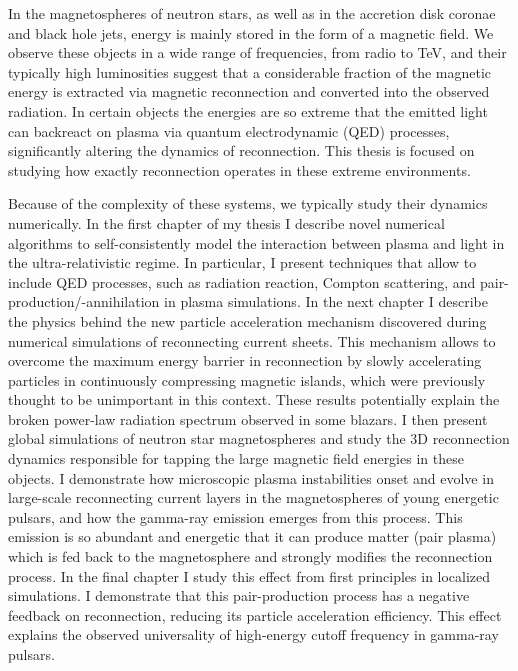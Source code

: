 In the magnetospheres of neutron stars, as well as in the accretion disk coronae and black hole jets, energy is mainly stored in the form of a magnetic field. We observe these objects in a wide range of frequencies, from radio to TeV, and their typically high luminosities suggest that a considerable fraction of the magnetic energy is extracted via magnetic reconnection and converted into the observed radiation. In certain objects the energies are so extreme that the emitted light can backreact on plasma via quantum electrodynamic (QED) processes, significantly altering the dynamics of reconnection. This thesis is focused on studying how exactly reconnection operates in these extreme environments. 

Because of the complexity of these systems, we typically study their dynamics numerically. In the first chapter of my thesis I describe novel numerical algorithms to self-consistently model the interaction between plasma and light in the ultra-relativistic regime. In particular, I present techniques that allow to include QED processes, such as radiation reaction, Compton scattering, and pair-production/-annihilation in plasma simulations. In the next chapter I describe the physics behind the new particle acceleration mechanism discovered during numerical simulations of reconnecting current sheets. This mechanism allows to overcome the maximum energy barrier in reconnection by slowly accelerating particles in continuously compressing magnetic islands, which were previously thought to be unimportant in this context. These results potentially explain the broken power-law radiation spectrum observed in some blazars. I then present global simulations of neutron star magnetospheres and study the 3D reconnection dynamics responsible for tapping the large magnetic field energies in these objects. I demonstrate how microscopic plasma instabilities onset and evolve in large-scale reconnecting current layers in the magnetospheres of young energetic pulsars, and how the gamma-ray emission emerges from this process. This emission is so abundant and energetic that it can produce matter (pair plasma) which is fed back to the magnetosphere and strongly modifies the reconnection process. In the final chapter I study this effect from first principles in localized simulations. I demonstrate that this pair-production process has a negative feedback on reconnection, reducing its particle acceleration efficiency. This effect explains the observed universality of high-energy cutoff frequency in gamma-ray pulsars. 